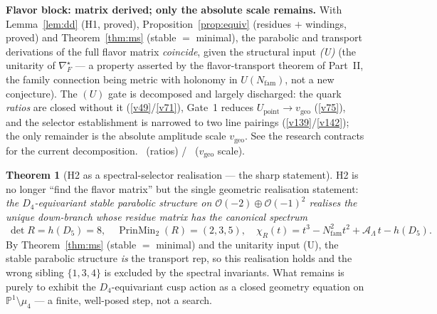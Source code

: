 \documentclass[11pt,a4paper]{article}
\newcommand{\Nfam}{N_{\mathrm{fam}}}
\newcommand{\AL}{\mathcal A_\Lambda}
\theoremstyle{definition}
\newtheorem{theorem}{Theorem}
\begin{document}
\par\smallskip\noindent\textbf{Flavor block: matrix derived; only the absolute scale remains.}
With Lemma~\ref{lem:dd} (H1, proved), Proposition~\ref{prop:equiv} (residues $+$ windings, proved) and
Theorem~\ref{thm:ms} (stable $=$ minimal), the parabolic and transport derivations of the full flavor
matrix \emph{coincide}, given the structural input \emph{(U)} (the unitarity of $\nabla_F^\star$ --- a
property asserted by the flavor-transport theorem of Part~II, the family connection being metric with
holonomy in $U(\Nfam)$, not a new conjecture). The $(U)$ gate is decomposed and largely discharged: the
quark \emph{ratios} are closed without it (\vref{v49}/\vref{v71}), Gate~1 reduces
$U_{\mathrm{point}}\to v_{\mathrm{geo}}$ (\vref{v75}), and the selector establishment is narrowed to two
line pairings (\vref{v139}/\vref{v142}); the only remainder is the absolute amplitude scale
$v_{\mathrm{geo}}$. See the research contracts for the current decomposition. \mE\ (ratios) / \mO\
($v_{\mathrm{geo}}$ scale).
\par\smallskip

\begin{theorem}[H2 as a spectral-selector realisation --- the sharp statement]
\label{thm:h2}
H2 is no longer ``find the flavor matrix'' but the single geometric realisation statement: \emph{the
$D_4$-equivariant stable parabolic structure on $\mathcal O(-2)\oplus\mathcal O(-1)^2$ realises the unique
down-branch whose residue matrix has the canonical spectrum}
\[
  \boxed{\ \det R=h(D_5)=8,\quad \operatorname{PrinMin}_2(R)=(2,3,5),\quad
  \chi_R(t)=t^3-\Nfam^2t^2+\AL\,t-h(D_5).\ }
\]
By Theorem~\ref{thm:ms} (stable $=$ minimal) and the unitarity input (U), the stable parabolic structure
\emph{is} the transport rep, so this realisation holds and the wrong sibling $\{1,3,4\}$ is excluded by
the spectral invariants. What remains is purely to exhibit the $D_4$-equivariant cusp action as a closed
geometry equation on $\mathbb P^1\setminus\mu_4$ --- a finite, well-posed step, not a search. \mC
\end{theorem}

\end{document}
